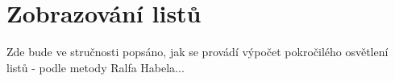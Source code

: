 \section{Zobrazování listů}
\label{sec-leafMethod}

Zde bude ve stručnosti popsáno, jak se provádí výpočet pokročilého osvětlení listů - podle metody Ralfa Habela...